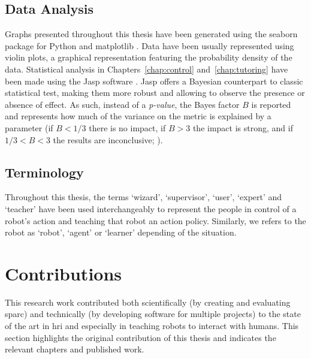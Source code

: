 \subsection{Data Analysis}
Graphs presented throughout this thesis have been generated using the seaborn package for Python and matplotlib \citep{waskom2017seaborn}. Data have been usually represented using violin plots, a graphical representation featuring the probability density of the data. Statistical analysis in Chapters~\ref{chap:control} and~\ref{chap:tutoring} have been made using the Jasp software \citep{jasp2018}. Jasp offers a Bayesian counterpart to classic statistical test, making them more robust and allowing to observe the presence or absence of effect. As such, instead of a \emph{p-value}, the Bayes factor $B$ is reported and represents how much of the variance on the metric is explained by a parameter (if $B < 1/3$ there is no impact, if $B > 3$ the impact is strong, and if $1/3<B<3$ the results are inconclusive; \citealt{jeffreys1998theory,dienes2011bayesian}). 

\subsection{Terminology}

Throughout this thesis, the terms `wizard', `supervisor', `user', `expert' and `teacher' have been used interchangeably to represent the people in control of a robot's action and teaching that robot an action policy. Similarly, we refers to the robot as `robot', `agent' or `learner' depending of the situation.
%
%

\section{Contributions}\label{sec:intro_contr}

This research work contributed both scientifically (by creating and evaluating \gls{sparc}) and technically (by developing software for multiple projects) to the state of the art in \gls{hri} and especially in teaching robots to interact with humans. This section highlights the original contribution of this thesis and indicates the relevant chapters and published work.


